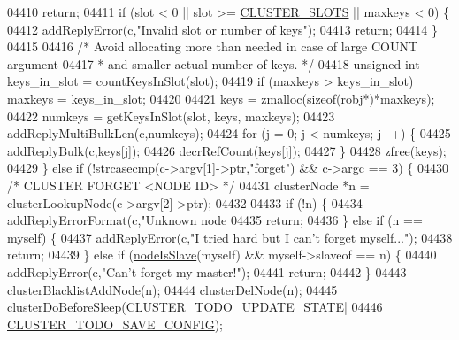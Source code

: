 \begin{DoxyCode}
{{{{{{{{{{{{{{{{{{{{{{{{{{{{{{{{{{{{{{{{{{{{{{{{{{{{{{{{{{{{{{{{{{{{{{{{{{{{{{{{{{{{{{{{{{{{{{{{{{{{04410             \textcolor{keywordflow}{return};
04411         \textcolor{keywordflow}{if} (slot < 0 || slot >= \hyperlink{cluster_8h_aa3e2cb951eebb16725ecc3f5beefd9fd}{CLUSTER\_SLOTS} || maxkeys < 0) \{
04412             addReplyError(c,\textcolor{stringliteral}{"Invalid slot or number of keys"});
04413             \textcolor{keywordflow}{return};
04414         \}
04415 
04416         \textcolor{comment}{/* Avoid allocating more than needed in case of large COUNT argument}
04417 \textcolor{comment}{         * and smaller actual number of keys. */}
04418         \textcolor{keywordtype}{unsigned} \textcolor{keywordtype}{int} keys\_in\_slot = countKeysInSlot(slot);
04419         \textcolor{keywordflow}{if} (maxkeys > keys\_in\_slot) maxkeys = keys\_in\_slot;
04420 
04421         keys = zmalloc(\textcolor{keyword}{sizeof}(robj*)*maxkeys);
04422         numkeys = getKeysInSlot(slot, keys, maxkeys);
04423         addReplyMultiBulkLen(c,numkeys);
04424         \textcolor{keywordflow}{for} (j = 0; j < numkeys; j++) \{
04425             addReplyBulk(c,keys[j]);
04426             decrRefCount(keys[j]);
04427         \}
04428         zfree(keys);
04429     \} \textcolor{keywordflow}{else} \textcolor{keywordflow}{if} (!strcasecmp(c->argv[1]->ptr,\textcolor{stringliteral}{"forget"}) && c->argc == 3) \{
04430         \textcolor{comment}{/* CLUSTER FORGET <NODE ID> */}
04431         clusterNode *n = clusterLookupNode(c->argv[2]->ptr);
04432 
04433         \textcolor{keywordflow}{if} (!n) \{
04434             addReplyErrorFormat(c,\textcolor{stringliteral}{"Unknown node %
04435             \textcolor{keywordflow}{return};
04436         \} \textcolor{keywordflow}{else} \textcolor{keywordflow}{if} (n == myself) \{
04437             addReplyError(c,\textcolor{stringliteral}{"I tried hard but I can't forget myself..."});
04438             \textcolor{keywordflow}{return};
04439         \} \textcolor{keywordflow}{else} \textcolor{keywordflow}{if} (\hyperlink{cluster_8h_a3c99881f6892130c902b42b1f84a0e11}{nodeIsSlave}(myself) && myself->slaveof == n) \{
04440             addReplyError(c,\textcolor{stringliteral}{"Can't forget my master!"});
04441             \textcolor{keywordflow}{return};
04442         \}
04443         clusterBlacklistAddNode(n);
04444         clusterDelNode(n);
04445         clusterDoBeforeSleep(\hyperlink{cluster_8h_abea0d393cba342261e4a7e6fb745f388}{CLUSTER\_TODO\_UPDATE\_STATE}|
04446                              \hyperlink{cluster_8h_a0ae5ff08fbae3c655012b4de8bfc327d}{CLUSTER\_TODO\_SAVE\_CONFIG});
}}}}}}}}}}}}}}}}}}}}}}}}}}}}}}}}}}}}}}}}}}}}}}}}}}}}}}}}}}}}}}}}}}}}}}}}}}}}}}}}}}}}}}}}}}}}}}}}}}}}}
\end{DoxyCode}
